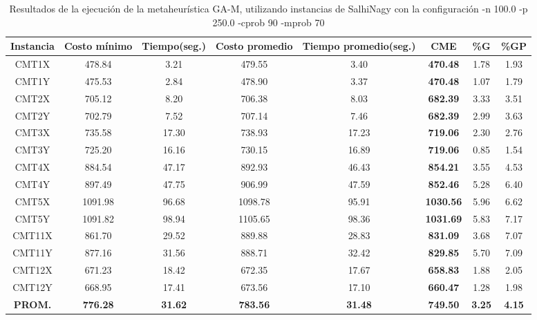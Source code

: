 \begin{table}[h]
\caption{Resultados de la ejecución de la metaheurística GA-M, utilizando instancias de SalhiNagy con la configuración -n 100.0 -p 250.0 -cprob 90 -mprob 70}
\centering
\small
\begin{tabular}{c c c c c c c c}
\hline\hline
Instancia & Costo mínimo & Tiempo(seg.) & Costo promedio & Tiempo promedio(seg.) & CME & \%G & \%GP \\ [0.5ex]
\hline
CMT1X & 478.84 & 3.21 & 
479.55 & 3.40 & \bf{470.48} & 
1.78 & 1.93\\CMT1Y & 475.53 & 2.84 & 
478.90 & 3.37 & \bf{470.48} & 
1.07 & 1.79\\CMT2X & 705.12 & 8.20 & 
706.38 & 8.03 & \bf{682.39} & 
3.33 & 3.51\\CMT2Y & 702.79 & 7.52 & 
707.14 & 7.46 & \bf{682.39} & 
2.99 & 3.63\\CMT3X & 735.58 & 17.30 & 
738.93 & 17.23 & \bf{719.06} & 
2.30 & 2.76\\CMT3Y & 725.20 & 16.16 & 
730.15 & 16.89 & \bf{719.06} & 
0.85 & 1.54\\CMT4X & 884.54 & 47.17 & 
892.93 & 46.43 & \bf{854.21} & 
3.55 & 4.53\\CMT4Y & 897.49 & 47.75 & 
906.99 & 47.59 & \bf{852.46} & 
5.28 & 6.40\\CMT5X & 1091.98 & 96.68 & 
1098.78 & 95.91 & \bf{1030.56} & 
5.96 & 6.62\\CMT5Y & 1091.82 & 98.94 & 
1105.65 & 98.36 & \bf{1031.69} & 
5.83 & 7.17\\CMT11X & 861.70 & 29.52 & 
889.88 & 28.83 & \bf{831.09} & 
3.68 & 7.07\\CMT11Y & 877.16 & 31.56 & 
888.71 & 32.42 & \bf{829.85} & 
5.70 & 7.09\\CMT12X & 671.23 & 18.42 & 
672.35 & 17.67 & \bf{658.83} & 
1.88 & 2.05\\CMT12Y & 668.95 & 17.41 & 
673.56 & 17.10 & \bf{660.47} & 
1.28 & 1.98\\\bf{PROM.} & 
\bf{776.28} & \bf{31.62} & \bf{783.56} & \bf{31.48} & \bf{749.50} & \bf{3.25} & \bf{4.15}\\[1ex]\hline
\end{tabular}
\label{table:nonlin}
\end{table} 

